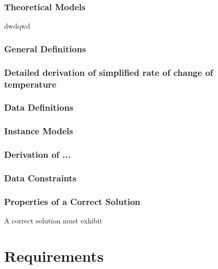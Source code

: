 \documentclass[12pt]{article}
\begin{document}
\subsubsection{Theoretical Models}\label{sec_theoretical}

dwdqwd

\subsubsection{General Definitions}\label{sec_gendef}


\subsubsection*{Detailed derivation of simplified rate of change of temperature}


\subsubsection{Data Definitions}\label{sec_datadef}


\subsubsection{Instance Models} \label{sec_instance}    

\subsubsection*{Derivation of ...}


\subsubsection{Data Constraints} \label{sec_DataConstraints}    

\subsubsection{Properties of a Correct Solution} \label{sec_CorrectSolution}

\noindent
A correct solution must exhibit 

\section{Requirements}
\end{document}
